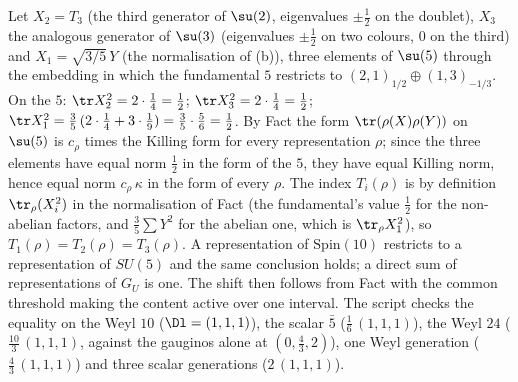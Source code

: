 Let $X_{2} = T_{3}$ (the third generator of $\su(2)$, eigenvalues $\pm\tfrac12$ on the doublet), $X_{3}$ the analogous generator of $\su(3)$ (eigenvalues $\pm\tfrac12$ on two colours, $0$ on the third) and $X_{1} = \sqrt{3/5}\,Y$ (the normalisation of (b)), three elements of $\su(5)$ through the embedding in which the fundamental $5$ restricts to $(2,1)_{1/2} \oplus (1,3)_{-1/3}$. On the $5$: $\tr X_{2}^{2} = 2 \cdot \tfrac14 = \tfrac12$; $\tr X_{3}^{2} = 2 \cdot \tfrac14 = \tfrac12$; $\tr X_{1}^{2} = \tfrac35\,(2 \cdot \tfrac14 + 3 \cdot \tfrac19) = \tfrac35 \cdot \tfrac56 = \tfrac12$. By Fact  the form $\tr(\rho(X)\rho(Y))$ on $\su(5)$ is $c_{\rho}$ times the Killing form for every representation $\rho$; since the three elements have equal norm $\tfrac12$ in the form of the $5$, they have equal Killing norm, hence equal norm $c_{\rho}\,\kappa$ in the form of every $\rho$. The index $T_{i}(\rho)$ is by definition $\tr_{\rho}(X_{i}^{2})$ in the normalisation of Fact  (the fundamental's value $\tfrac12$ for the non-abelian factors, and $\tfrac35 \sum Y^{2}$ for the abelian one, which is $\tr_{\rho}X_{1}^{2}$), so $T_{1}(\rho) = T_{2}(\rho) = T_{3}(\rho)$. A representation of $\mathrm{Spin}(10)$ restricts to a representation of $SU(5)$ and the same conclusion holds; a direct sum of representations of $G_{U}$ is one. The shift then follows from Fact  with the common threshold making the content active over one interval. The script checks the equality on the Weyl $10$ ($\Dl = (1,1,1)$), the scalar $\bar{5}$ ($\tfrac16\,(1,1,1)$), the Weyl $24$ ($\tfrac{10}{3}\,(1,1,1)$, against the gauginos alone at $(0, \tfrac43, 2)$), one Weyl generation ($\tfrac43\,(1,1,1)$) and three scalar generations ($2\,(1,1,1)$).
